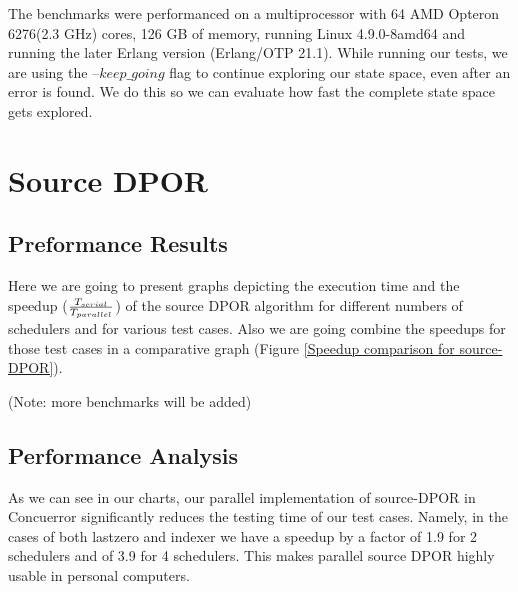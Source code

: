 
The benchmarks were performanced on a multiprocessor with 64 AMD Opteron 6276(2.3 GHz) cores, 126 GB of memory, running
Linux 4.9.0-8amd64 and running the later Erlang version (Erlang/OTP 21.1). While running our tests, we are using the
--$keep\_going$ flag to continue exploring our state space, even after an error is found. We do this so we can evaluate
how fast the complete state space gets explored.

\section{Source DPOR}

\subsection{Preformance Results}

Here we are going to present graphs depicting the execution time and the speedup ($T_{serial} 
\over T_{parallel}$) of the source DPOR algorithm
for different numbers of schedulers and for various test cases. Also we are going combine the 
speedups for those test cases in a comparative graph (Figure \ref{Speedup comparison for source-DPOR}).

(Note: more benchmarks will be added)

\iffalse
\mediumGraph{scripts/indexer15_time.png}{Execution time for indexer 15}
\mediumGraph{scripts/readers15_time.png}{Execution time for readers 15}
\mediumGraph{scripts/writers11_time.png}{Execution time for writers 11}

\mediumGraph{scripts/indexer15_speedup.png}{Speedup for indexer 15}
\mediumGraph{scripts/readers15_speedup.png}{Speedup time for readers 15}
\mediumGraph{scripts/writers11_speedup.png}{Speedup time for writers 11}
\fi

\subsection{Performance Analysis}

As we can see in our charts, our parallel implementation of source-DPOR in Concuerror significantly reduces the testing
time of our test cases. Namely, in the cases of both lastzero and indexer we have a speedup by a factor of 1.9 for 2 schedulers and
of 3.9 for 4 schedulers. This makes parallel source DPOR highly usable in personal computers.

